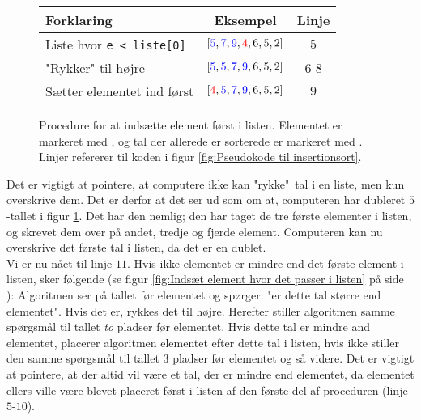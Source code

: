 
	\begin{figure}[h]
		\begin{center}
			\padtable
			\begin{tabular}{l|c|c}
				Forklaring & Eksempel & Linje \\
				\hline
				Liste hvor \verb|e < liste[0]| & $[\color{blue}5\color{black},\color{blue}7\color{black},\color{blue}9\color{black},\color{red}4\color{black},6,5,2]$ & $5$ \\
				"Rykker" til højre & $[\color{blue}5\color{black},\color{blue}5\color{black},\color{blue}7\color{black},\color{blue}9\color{black},6,5,2]$ & $6$-$8$\\
				Sætter elementet ind først  & $[\color{red}4\color{black},\color{blue}5\color{black},\color{blue}7\color{black},\color{blue}9\color{black},6,5,2]$ & $9$
			\end{tabular}
		\end{center}
		\vspace{-3mm}
		\caption{Procedure for at indsætte element først i listen. Elementet er markeret med , og tal der allerede er sorterede er markeret med . Linjer refererer til koden i figur \ref{fig:Pseudokode til insertionsort}.}
		\label{fig:Indsæt element først i listen}
	\end{figure}

	Det er vigtigt at pointere, at computere ikke kan "rykke"\ tal i en liste, men kun overskrive dem. Det er derfor at det ser ud som om at, computeren har dubleret $5$-tallet i figur \ref{fig:Indsæt element først i listen}. Det har den nemlig; den har taget de tre første elementer i listen, og skrevet dem over på andet, tredje og fjerde element. Computeren kan nu overskrive det første tal i listen, da det er en dublet.\\

	Vi er nu nået til linje $11$. Hvis ikke elementet er mindre end det første element i listen, sker følgende (se figur \ref{fig:Indsæt element hvor det passer i listen} på side \pageref{fig:Indsæt element hvor det passer i listen}): Algoritmen ser på tallet før elementet og spørger: "er dette tal større end elementet". Hvis det er, rykkes det til højre. Herefter stiller algoritmen samme spørgsmål til tallet \emph{to} pladser før elementet. Hvis dette tal er mindre and elementet, placerer algoritmen elementet efter dette tal i listen, hvis ikke stiller den samme spørgsmål til tallet 3 pladser før elementet og så videre. Det er vigtigt at pointere, at der altid vil være et tal, der er mindre end elementet, da elementet ellers ville være blevet placeret først i listen af den første del af proceduren (linje $5$-$10$).



